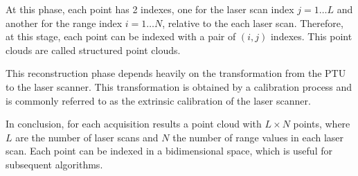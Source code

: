 At this phase, each point has 2 indexes, one for the laser scan index $j=1\dots L$ and another for the range index $i=1\dots N$, relative to the each laser scan. Therefore, at this stage, each point can be indexed with a pair of $(i,j)$ indexes. This point clouds are called structured point clouds.

This reconstruction phase depends heavily on the transformation from the PTU to the laser scanner. This transformation is obtained by a calibration process and is commonly referred to as the extrinsic calibration of the laser scanner.

In conclusion, for each acquisition results a point cloud with $L \times N$ points, where $L$ are the number of laser scans and $N$ the number of range values in each laser scan. Each point can be indexed in a bidimensional space, which is useful for subsequent algorithms.
